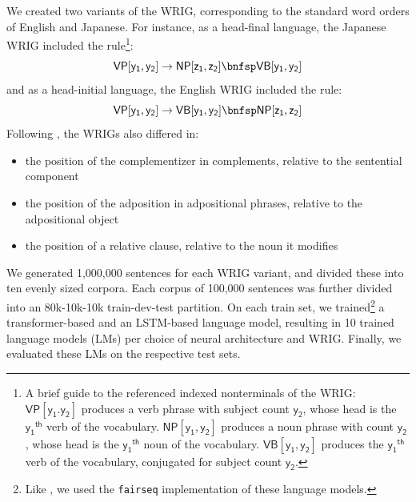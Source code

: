 \documentclass[11pt]{article}
\renewcommand{\bnfpn}[1]{\mathsf{#1}}
\renewcommand{\bnfpo}{\rightarrow}
\begin{document}
We created two variants of the WRIG, corresponding to the standard word orders of English and Japanese. For instance, as a head-final language, the Japanese WRIG included the rule\footnote{A brief guide to the referenced indexed nonterminals of the WRIG: $\bnfpn{VP[y_1.y_2]}$ produces a verb phrase with subject count $\bnfpn{y_2}$, whose head is the $\bnfpn{y_1}^{\mathsf{th}}$ verb of the vocabulary. 	$\bnfpn{NP[y_1,y_2]}$ produces a noun phrase with count $\bnfpn{y_2}$, whose head is the $\bnfpn{y_1}^{\mathsf{th}}$ noun of the vocabulary. $\bnfpn{VB[y_1,y_2]}$ produces the $\bnfpn{y_1}^{\mathsf{th}}$ verb of the vocabulary, conjugated for subject count $\bnfpn{y_2}$.}:
\begin{equation*}
\bnfpn{VP[y_1, y_2]} \bnfpo \bnfpn{NP[z_1, z_2]} \bnfsp \bnfpn{VB[y_1, y_2]}
\end{equation*}
and as a head-initial language, the English WRIG included the rule:
\begin{equation*}
\bnfpn{VP[y_1, y_2]} \bnfpo \bnfpn{VB[y_1, y_2]} \bnfsp \bnfpn{NP[z_1, z_2]}
\end{equation*}
Following \cite{white-cotterell-2021-examining}, the WRIGs also differed in:
\begin{itemize}
\item the position of the complementizer in complements, relative to the sentential component
	\item the position of the adposition in adpositional phrases, relative to the adpositional object
	\item the position of a relative clause, relative to the noun it modifies
\end{itemize}

\noindent We generated 1,000,000 sentences for each WRIG variant, and divided these into ten evenly sized corpora. Each corpus of 100,000 sentences was further divided into an 80k-10k-10k train-dev-test partition. On each train set, we trained\footnote{Like \citet{white-cotterell-2021-examining}, we used the \texttt{fairseq} implementation \cite{ott-etal-2019-fairseq} of these language models.} a transformer-based and an LSTM-based language model, resulting in 10 trained language models (LMs) per choice of neural architecture and WRIG. Finally, we evaluated these LMs on the respective test sets. 
\end{document}
